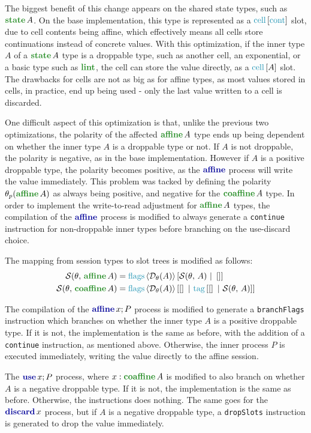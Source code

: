 The biggest benefit of this change appears on the shared state types, such as $\statet{A}$. On the base implementation, this type is represented as a $\cells{\conts}$ slot, due to cell contents being affine, which effectively means all cells store continuations instead of concrete values. With this optimization, if the inner type $A$ of a $\statet{A}$ type is a droppable type, such as another cell, an exponential, or a basic type such as $\lintt$, the cell can store the value directly, as a $\cells{A}$ slot. The drawbacks for cells are not as big as for affine types, as most values stored in cells, in practice, end up being used - only the last value written to a cell is discarded.

One difficult aspect of this optimization is that, unlike the previous two optimizations, the polarity of the affected $\affinet{A}$ type ends up being dependent on whether the inner type $A$ is a droppable type or not. If $A$ is not droppable, the polarity is negative, as in the base implementation. However if $A$ is a positive droppable type, the polarity becomes positive, as the $\affinep$ process will write the value immediately. This problem was tacked by defining the polarity $\polarityof{\theta}{\affinet{A}}$ as always being positive, and negative for the $\coaffinet{A}$ type. In order to implement the write-to-read adjustment for $\affinet{A}$ types, the compilation of the $\affinep$ process is modified to always generate a \texttt{continue} instruction for non-droppable inner types before branching on the use-discard choice.

The mapping from session types to slot trees is modified as follows:
\begin{align*}
    \slots{\theta}{\affinet{A}} &= \flagsst{\isdroppable{A}}{\slots{\theta}{A}}{\nilst} \\
    \slots{\theta}{\coaffinet{A}} &= \flagsst{\isdroppable{A}}{\nilst}{\tagst{\nilst\tagsepst\slots{\theta}{A}}}
\end{align*}

The compilation of the $\affinec{x}{P}$ process is modified to generate a \texttt{branchFlags} instruction which branches on whether the inner type $A$ is a positive droppable type. If it is not, the implementation is the same as before, with the addition of a \texttt{continue} instruction, as mentioned above. Otherwise, the inner process $P$ is executed immediately, writing the value directly to the affine session.

The $\usec{x}{P}$ process, where $x: \coaffinet{A}$ is modified to also branch on whether $A$ is a negative droppable type. If it is not, the implementation is the same as before. Otherwise, the instructions does nothing. The same goes for the $\discardc{x}$ process, but if $A$ is a negative droppable type, a \texttt{dropSlots} instruction is generated to drop the value immediately.

